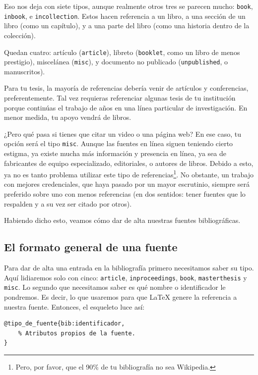 Eso nos deja con siete tipos, aunque realmente otros tres se parecen mucho: \texttt{book}, \texttt{inbook}, e \texttt{incollection}. Estos hacen referencia a un libro, a una sección de un libro (como un capítulo), y a una parte del libro (como una historia dentro de la colección).

Quedan cuatro: artículo (\texttt{article}), libreto (\texttt{booklet}, como un libro de menos prestigio), miscelánea (\texttt{misc}), y documento no publicado (\texttt{unpublished}, o manuscritos).

Para tu tesis, la mayoría de referencias debería venir de artículos y conferencias, preferentemente. Tal vez requieras referenciar algunas tesis de tu institución porque continúas el trabajo de años en una línea particular de investigación. En menor medida, tu apoyo vendrá de libros.

¿Pero qué pasa si tienes que citar un video o una página web? En ese caso, tu opción será el tipo \texttt{misc}. Aunque las fuentes en línea siguen teniendo cierto estigma, ya existe mucha más información y presencia en línea, ya sea de fabricantes de equipo especializado, editoriales, o autores de libros. Debido a esto, ya no es tanto problema utilizar este tipo de referencias\footnote{Pero, por favor, que el 90\% de tu bibliografía no sea Wikipedia.}. No obstante, un trabajo con mejores credenciales, que haya pasado por un mayor escrutinio, siempre será preferido sobre uno con menos referencias (en dos sentidos: tener fuentes que lo respalden y a su vez ser citado por otros).

Habiendo dicho esto, veamos cómo dar de alta nuestras fuentes bibliográficas.



\subsection{El formato general de una fuente}
\label{sub:el_formato_general_de_una_fuente}


Para dar de alta una entrada en la bibliografía primero necesitamos saber su tipo. Aquí lidiaremos solo con cinco: \texttt{article}, \texttt{inproceedings}, \texttt{book}, \texttt{masterthesis} y \texttt{misc}. Lo segundo que necesitamos saber es qué nombre o identificador le pondremos. Es decir, lo que usaremos para que \LaTeX{} genere la referencia a nuestra fuente. Entonces, el esqueleto luce así:

\begin{lstlisting}[style=bibtex]
@tipo_de_fuente{bib:identificador,
	% Atributos propios de la fuente.
}
\end{lstlisting}

